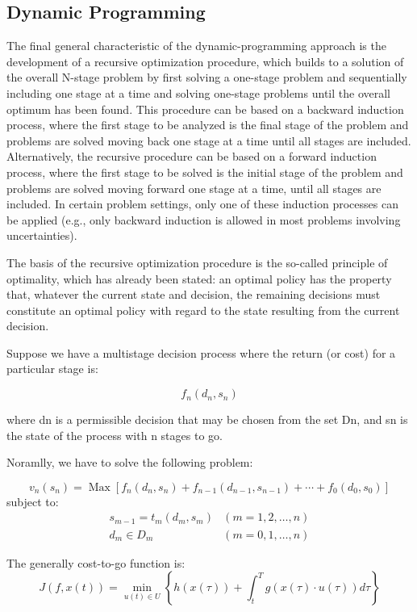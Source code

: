 \documentclass{mcmthesis}
\begin{document}
\subsection{Dynamic Programming}
The final general characteristic of the dynamic-programming approach is the development of a recursive optimization procedure, which builds to a solution of the overall N-stage problem by first solving a one-stage problem and sequentially including one stage at a time and solving one-stage problems until the overall optimum has been found. This procedure can be based on a backward induction process, where the first stage to be analyzed is the final stage of the problem and problems are solved moving back one stage at a time until all stages are included. Alternatively, the recursive procedure can be based on a forward induction process, where the first stage to be solved is the initial stage of the problem and problems are solved moving forward
one stage at a time, until all stages are included. In certain problem settings, only one of these induction processes can be applied (e.g., only backward induction is allowed in most problems involving uncertainties).

The basis of the recursive optimization procedure is the so-called principle of optimality, which has already been stated: an optimal policy has the property that, whatever the current state and decision, the remaining decisions must constitute an optimal policy with regard to the state resulting from the current decision.

Suppose we have a multistage decision process where the return (or cost) for a particular stage is:

$$f_n(d_n,s_n)$$

where dn is a permissible decision that may be chosen from the set Dn, and sn is the state of the process with n stages to go.

Noramlly, we have to solve the following problem:

\[
v_{n}\left(s_{n}\right)=\operatorname{Max}\left[f_{n}\left(d_{n}, s_{n}\right)+f_{n-1}\left(d_{n-1}, s_{n-1}\right)+\cdots+f_{0}\left(d_{0}, s_{0}\right)\right]
\]
subject to:
\[
\begin{array}{ll}
s_{m-1}=t_{m}\left(d_{m}, s_{m}\right) & (m=1,2, \ldots, n) \\
d_{m} \in D_{m} & (m=0,1, \ldots, n)
\end{array}
\]

The generally cost-to-go function is:
$$J(f, x(t))=\min _{u(t) \in U}\left\{h(x(\tau))+\int_{t}^{T} g(x(\tau) \cdot u(\tau)) d \tau\right\}$$
\end{document}
